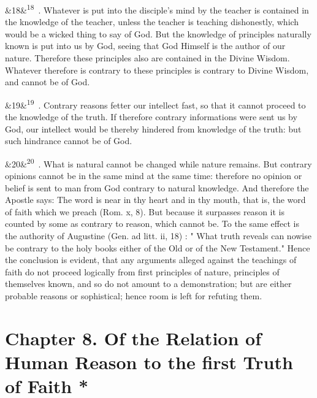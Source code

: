 \documentclass[12pt]{article}
\newcommand{\para}[1][]{\par\noindent\ifx&#1&\else\textsuperscript{\footnotesize #1}~\fi}
\begin{document}
\para[18] 2. Whatever is put into the disciple's mind by the teacher is contained in the knowledge of the teacher, unless the teacher is teaching dishonestly, which would be a wicked thing to say of God. But the knowledge of principles naturally known is put into us by God, seeing that God Himself is the author of our nature. Therefore these principles also are contained in the Divine Wisdom. Whatever therefore is contrary to these principles is contrary to Divine Wisdom, and cannot be of God.

\para[19] 3. Contrary reasons fetter our intellect fast, so that it cannot proceed to the knowledge of the truth. If therefore contrary informations were sent us by God, our intellect would be thereby hindered from knowledge of the truth: but such hindrance cannot be of God.

\para[20] 4. What is natural cannot be changed while nature remains. But contrary opinions cannot be in the same mind at the same time: therefore no opinion or belief is sent to man from God contrary to natural knowledge. And therefore the Apostle says: The word is near in thy heart and in thy mouth, that is, the word of faith which we preach (Rom. x, 8). But because it surpasses reason it is counted by some as contrary to reason, which cannot be. To the same effect is the authority of Augustine (Gen. ad litt. ii, 18) : " What truth reveals can nowise be contrary to the holy books either of the Old or of the New Testament." Hence the conclusion is evident, that any arguments alleged against the teachings of faith do not proceed logically from first principles of nature, principles of themselves known, and so do not amount to a demonstration; but are either probable reasons or sophistical; hence room is left for refuting them.

\section*{Chapter 8. Of the Relation of Human Reason to the first Truth of Faith *}
\end{document}

